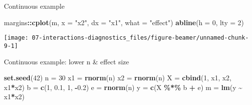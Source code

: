 \documentclass[
  ignorenonframetext,
]{beamer}
\newenvironment{Shaded}{\begin{snugshade}}{\end{snugshade}}
\newcommand{\AttributeTok}[1]{\textcolor[rgb]{0.13,0.29,0.53}{#1}}
\newcommand{\DecValTok}[1]{\textcolor[rgb]{0.00,0.00,0.81}{#1}}
\newcommand{\FloatTok}[1]{\textcolor[rgb]{0.00,0.00,0.81}{#1}}
\newcommand{\FunctionTok}[1]{\textcolor[rgb]{0.13,0.29,0.53}{\textbf{#1}}}
\newcommand{\NormalTok}[1]{#1}
\newcommand{\OtherTok}[1]{\textcolor[rgb]{0.56,0.35,0.01}{#1}}
\newcommand{\SpecialCharTok}[1]{\textcolor[rgb]{0.81,0.36,0.00}{\textbf{#1}}}
\newcommand{\StringTok}[1]{\textcolor[rgb]{0.31,0.60,0.02}{#1}}
\begin{document}
\begin{frame}[fragile]{Continuous example}
\protect\hypertarget{continuous-example}{}
\begin{Shaded}
\begin{Highlighting}[]
\NormalTok{margins}\SpecialCharTok{::}\FunctionTok{cplot}\NormalTok{(m, }\AttributeTok{x =} \StringTok{"x2"}\NormalTok{, }\AttributeTok{dx =} \StringTok{"x1"}\NormalTok{, }\AttributeTok{what =} \StringTok{"effect"}\NormalTok{)}
\FunctionTok{abline}\NormalTok{(}\AttributeTok{h =} \DecValTok{0}\NormalTok{, }\AttributeTok{lty =} \DecValTok{2}\NormalTok{)}
\end{Highlighting}
\end{Shaded}

\texttt{[image: 07-interactions-diagnostics\_files/figure-beamer/unnamed-chunk-9-1]}
\end{frame}

\begin{frame}[fragile]{Continuous example: lower n \& effect size}
\protect\hypertarget{continuous-example-lower-n-effect-size}{}
\begin{Shaded}
\begin{Highlighting}[]
\FunctionTok{set.seed}\NormalTok{(}\DecValTok{42}\NormalTok{)}
\NormalTok{n  }\OtherTok{=} \DecValTok{30}
\NormalTok{x1 }\OtherTok{=} \FunctionTok{rnorm}\NormalTok{(n)}
\NormalTok{x2 }\OtherTok{=} \FunctionTok{rnorm}\NormalTok{(n)}
\NormalTok{X  }\OtherTok{=} \FunctionTok{cbind}\NormalTok{(}\DecValTok{1}\NormalTok{, x1, x2, x1}\SpecialCharTok{*}\NormalTok{x2)}
\NormalTok{b  }\OtherTok{=} \FunctionTok{c}\NormalTok{(}\DecValTok{1}\NormalTok{, }\FloatTok{0.1}\NormalTok{, }\DecValTok{1}\NormalTok{, }\SpecialCharTok{{-}}\FloatTok{0.2}\NormalTok{)}
\NormalTok{e  }\OtherTok{=} \FunctionTok{rnorm}\NormalTok{(n)}
\NormalTok{y  }\OtherTok{=} \FunctionTok{c}\NormalTok{(X }\SpecialCharTok{\%*\%}\NormalTok{ b }\SpecialCharTok{+}\NormalTok{ e)}
\NormalTok{m  }\OtherTok{=} \FunctionTok{lm}\NormalTok{(y }\SpecialCharTok{\textasciitilde{}}\NormalTok{ x1}\SpecialCharTok{*}\NormalTok{x2)}
\end{Highlighting}
\end{Shaded}
\end{frame}
\end{document}
